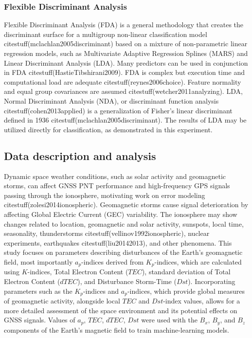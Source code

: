 \let\LaTeXcline\cline\documentclass[sn-mathphys-num]{sn-jnl}\let\cline\LaTeXcline
\begin{document}
\subsubsection{Flexible Discriminant Analysis}

Flexible Discriminant Analysis (FDA) is a general methodology that creates the discriminant surface for a multigroup non-linear classification model citestuff(mclachlan2005discriminant) based on a mixture of non-parametric linear regression models, such as Multivariate Adaptive Regression Splines (MARS) and Linear Discriminant Analysis (LDA). Many predictors can be used in conjunction in FDA citestuff(HastieTibshirani2009). FDA is complex but execution time and computational load are adequate citestuff(reynes2006choice). Feature normality and equal group covariances are assumed citestuff(wetcher2011analyzing). LDA, Normal Discriminant Analysis (NDA), or discriminant function analysis citestuff(cohen2013applied) is a generalization of Fisher's linear discriminant defined in 1936 citestuff(mclachlan2005discriminant). The results of LDA may be utilized directly for classification, as demonstrated in this experiment.

\subsection{Data description and analysis}

Dynamic space weather conditions, such as solar activity and geomagnetic storms, can affect  GNSS PNT performance and high-frequency GPS signals passing through the ionosphere, motivating work on error modeling citestuff(zolesi2014ionospheric). Geomagnetic storms cause signal deterioration by affecting Global Electric Current (GEC) variability. The ionosphere may show changes related to location, geomagnetic and solar activity, sunspots, local time, seasonality, thunderstorms citestuff(vellinov1992ionospheric), nuclear experiments, earthquakes citestuff(liu20142013), and other phenomena. This study focuses on parameters describing disturbances of the Earth's geomagnetic field, most importantly $a_{p}$-indices derived from $K_{p}$-indices, which are calculated using $K$-indices, Total Electron Content ($TEC$), standard deviation of Total Electron Content ($dTEC$), and Disturbance Storm-Time ($Dst$). Incorporating parameters such as the $K_{p}$-indices and $a_{p}$-indices, which provide global measures of geomagnetic activity, alongside local $TEC$ and $Dst$-index values, allows for a more detailed assessment of the space environment and its potential effects on GNSS signals. Values of $a_{p}$, $TEC$, $dTEC$, $Dst$ were used with the $B_x$, $B_y$, and $B_z$ components of the Earth's magnetic field to train machine-learning models.
\end{document}
